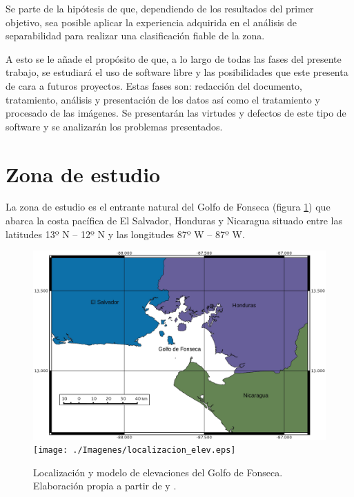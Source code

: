 Se parte de la hipótesis de que, dependiendo de los resultados del primer objetivo, sea posible aplicar la experiencia adquirida en el análisis de separabilidad para realizar una clasificación fiable de la zona.%

A esto se le añade el propósito de que, a lo largo de todas las fases del presente trabajo, se estudiará el uso de software libre y las posibilidades que este presenta de cara a futuros proyectos. Estas fases son: redacción del documento, tratamiento, análisis y presentación de los datos así como el tratamiento y procesado de las imágenes. Se presentarán las virtudes y defectos de este tipo de software y se analizarán los problemas presentados.%

\section{Zona de estudio}\label{sec:zonaestudio}
La zona de estudio es el entrante natural del Golfo de Fonseca (figura \ref{fig:localizacion}) que abarca la costa pacífica de El Salvador, Honduras y Nicaragua situado entre las latitudes 13º N – 12º N y las longitudes 87º W – 87º W.%

\begin{figure}
	\centering
	\includegraphics[width=0.9\linewidth]{./Imagenes/localizacion.eps}
	\texttt{[image: ./Imagenes/localizacion\_elev.eps]}
	\caption[Localización y MDE del Golfo de Fonseca]{Localización y modelo de elevaciones del Golfo de Fonseca. Elaboración propia a partir de \cite{GADM2012} y \cite{SRTM2008}.}
	\label{fig:localizacion}
\end{figure}


